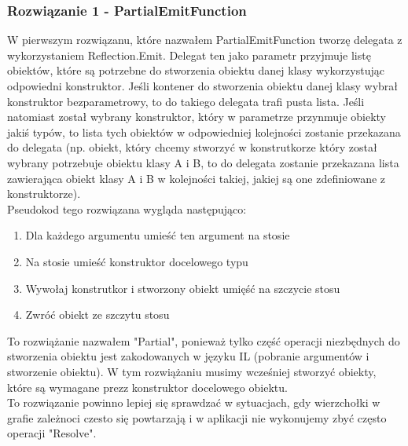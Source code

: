 \documentclass[12pt]{article}
\begin{document}
\subsubsection{Rozwiązanie 1 - PartialEmitFunction}
W pierwszym rozwiązanu, które nazwałem PartialEmitFunction tworzę delegata z wykorzystaniem Reflection.Emit. Delegat ten jako parametr przyjmuje listę obiektów, które są potrzebne do stworzenia obiektu danej klasy wykorzystując odpowiedni konstruktor. Jeśli kontener do stworzenia obiektu danej klasy wybrał konstruktor bezparametrowy, to do takiego delegata trafi pusta lista. Jeśli natomiast został wybrany konstruktor, który w parametrze przynmuje obiekty jakiś typów, to lista tych obiektów w odpowiedniej kolejności zostanie przekazana do delegata (np. obiekt, który chcemy stworzyć w konstrutkorze który został wybrany potrzebuje obiektu klasy A i B, to do delegata zostanie przekazana lista zawierająca obiekt klasy A i B w kolejności takiej, jakiej są one zdefiniowane z konstruktorze).\\
Pseudokod tego rozwiązana wygląda następująco:
\begin{enumerate}
	\item Dla każdego argumentu umieść ten argument na stosie
	\item Na stosie umieść konstruktor docelowego typu
	\item Wywołaj konstrutkor i stworzony obiekt umięść na szczycie stosu
	\item Zwróć obiekt ze szczytu stosu
\end{enumerate}
To rozwiążanie nazwałem "Partial", ponieważ tylko część operacji niezbędnych do stworzenia obiektu jest zakodowanych w języku IL (pobranie argumentów i stworzenie obiektu). W tym rozwiążaniu musimy wcześniej stworzyć obiekty, które są wymagane prezz konstruktor docelowego obiektu.\\
To rozwiązanie powinno lepiej się sprawdzać w sytuacjach, gdy wierzchołki w grafie zależnoci czesto się powtarzają i w aplikacji nie wykonujemy zbyć często operacji "Resolve".
\end{document}
